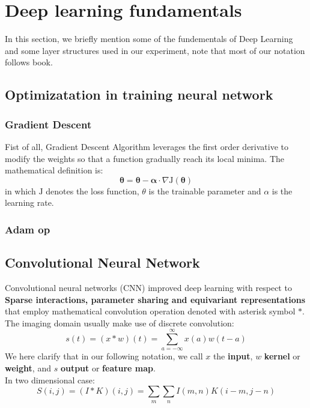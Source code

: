 \section{Deep learning fundamentals}
In this section, we briefly mention some of the fundementals of Deep Learning and some layer structures used in our experiment, note that most of our notation follows book\cite{Goodfellow-et-al-2016}.

\subsection{Optimizatation in training neural network}
\subsubsection{Gradient Descent}
Fist of all, Gradient Descent Algorithm leverages the first order derivative to modify the weights so that a function gradually reach its local minima. The mathematical definition is:
$$\boldsymbol{\theta}=\boldsymbol{\theta}-\boldsymbol{\alpha} \cdot \nabla \mathrm{J}(\boldsymbol{\theta})$$ 
in which $\mathrm{J}$ denotes the loss function, $\theta$ is the trainable parameter and $\alpha$ is the learning rate.

\subsubsection{Adam op}
\subsection{Convolutional Neural Network}
Convolutional neural networks (CNN) improved deep learning with respect to \textbf{Sparse interactions, parameter sharing and equivariant representations} that employ mathematical convolution operation denoted with asterisk symbol $*$. The imaging domain usually make use of discrete convolution: $$s(t)=(x * w)(t)=\sum_{a=-\infty}^{\infty} x(a) w(t-a)$$
We here clarify that in our following notation, we call $x$ the \textbf{input}, $w$ \textbf{kernel} or \textbf{weight}, and $s$ \textbf{output} or \textbf{feature map}.\\
In two dimensional case:
$$S(i, j)=(I * K)(i, j)=\sum_{m} \sum_{n} I(m, n) K(i-m, j-n)$$
